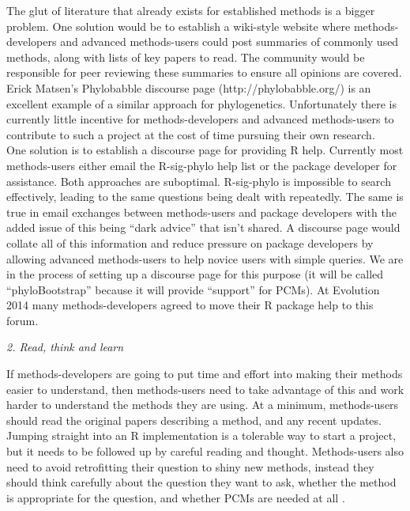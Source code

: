 \documentclass[a4paper,12pt]{article}
\renewcommand{\subsection}[1]{
  \bigskip
  \begin{center}
  \begin{large}
  \normalfont\itshape #1
  \end{large}
  \end{center}
}
\begin{document}
The glut of literature that already exists for established methods is a bigger problem. 
One solution would be to establish a wiki-style website where methods-developers and advanced methods-users could post summaries of commonly used methods, along with lists of key papers to read. 
The community would be responsible for peer reviewing these summaries to ensure all opinions are covered. 
Erick Matsen's Phylobabble discourse page (http://phylobabble.org/) is an excellent example of a similar approach for phylogenetics. Unfortunately there is currently little incentive for methods-developers and advanced methods-users to contribute to such a project at the cost of time pursuing their own research.\\

One solution is to establish a discourse page for providing R help. 
Currently most methods-users either email the R-sig-phylo help list or the package developer for assistance. 
Both approaches are suboptimal. 
R-sig-phylo is impossible to search effectively, leading to the same questions being dealt with repeatedly. 
The same is true in email exchanges between methods-users and package developers with the added issue of this being ``dark advice'' that isn't shared. 
A discourse page would collate all of this information and reduce pressure on package developers by allowing advanced methods-users to help novice users with simple queries. 
We are in the process of setting up a discourse page for this purpose (it will be called ``phyloBootstrap'' because it will provide ``support'' for PCMs). At Evolution 2014 many methods-developers agreed to move their R package help to this forum.

\subsection{2. Read, think and learn}
If methods-developers are going to put time and effort into making their methods easier to understand, then methods-users need to take advantage of this and work harder to understand the methods they are using. 
At a minimum, methods-users should read the original papers describing a method, and any recent updates. 
Jumping straight into an R implementation is a tolerable way to start a project, but it needs to be followed up by careful reading and thought. 
Methods-users also need to avoid retrofitting their question to shiny new methods, instead they should think carefully about the question they want to ask, whether the method is appropriate for the question, and whether PCMs are
needed at all \citep{losos2011seeing}.\\
\end{document}
